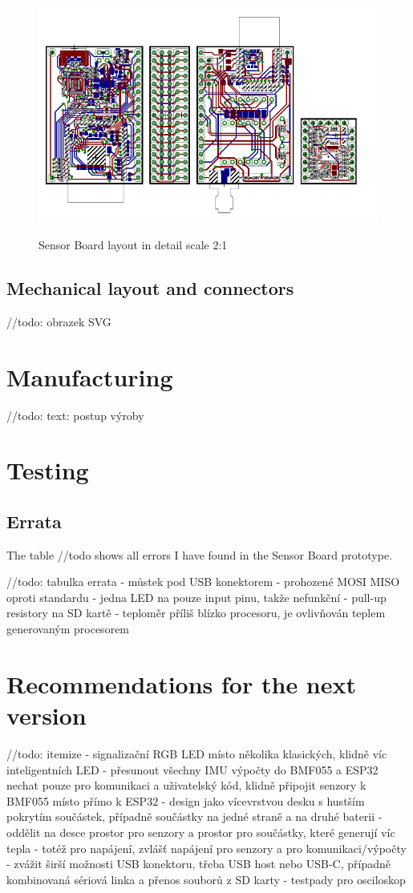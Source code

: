 \documentclass[12pt,a4paper]{article}
\begin{document}
\begin{figure}
	\centering
	\includegraphics[angle=90, scale=2]{img/brd.pdf}
	\label{brd2}
	\caption{Sensor Board layout in detail scale 2:1}
\end{figure}

\subsection{Mechanical layout and connectors}
//todo: obrazek SVG

\section{Manufacturing}
//todo: text: postup výroby



\section{Testing}

\subsection{Errata}
The table //todo shows all errors I have found in the Sensor Board prototype.

//todo: tabulka errata
- můstek pod USB konektorem
- prohozené MOSI MISO oproti standardu
- jedna LED na pouze input pinu, takže nefunkční
- pull-up resistory na SD kartě
- teploměr příliš blízko procesoru, je ovlivňován teplem generovaným procesorem

\section{Recommendations for the next version}

//todo: itemize
- signalizační RGB LED místo několika klasických, klidně víc inteligentních LED
- přesunout všechny IMU výpočty do BMF055 a ESP32 nechat pouze pro komunikaci a uživatelský kód, klidně připojit senzory k BMF055 místo přímo k ESP32
- design jako vícevrstvou desku s hustším pokrytím součástek, případně součástky na jedné straně a na druhé baterii
- oddělit na desce prostor pro senzory a prostor pro součástky, které generují víc tepla
- totéž pro napájení, zvlášť napájení pro senzory a pro komunikaci/výpočty
- zvážit širší možnosti USB konektoru, třeba USB host nebo USB-C, případně kombinovaná sériová linka a přenos souborů z SD karty
- testpady pro osciloskop
\end{document}
